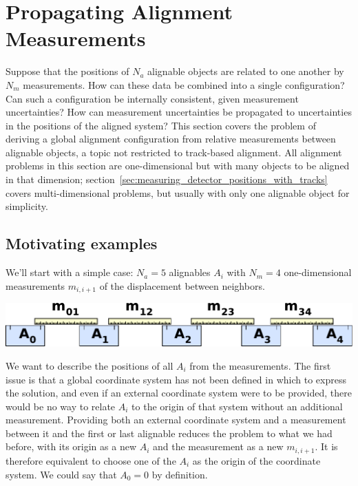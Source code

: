 \documentclass[12pt]{article}
\begin{document}
\section{Propagating Alignment Measurements}
\label{sec:propagating_alignment_measurements}

Suppose that the positions of $N_a$ alignable objects are related to
one another by $N_m$ measurements.  How can these data be combined
into a single configuration?  Can such a configuration be internally
consistent, given measurement uncertainties?  How can measurement
uncertainties be propagated to uncertainties in the positions of the
aligned system?  This section covers the problem of deriving a global
alignment configuration from relative measurements between alignable
objects, a topic not restricted to track-based alignment.  All
alignment problems in this section are one-dimensional but with many
objects to be aligned in that dimension;
section~\ref{sec:measuring_detector_positions_with_tracks} covers
multi-dimensional problems, but usually with only one alignable object
for simplicity.

\subsection{Motivating examples}

\vspace{0.2 cm}
\begin{minipage}{\linewidth}
We'll start with a simple case: $N_a=5$ alignables $A_i$ with $N_m=4$
one-dimensional measurements $m_{i,i+1}$ of the displacement between
neighbors.
\begin{center}
\includegraphics[width=0.8\linewidth]{PLOTS/propagating_example1.pdf}
\end{center}
\end{minipage}

\vspace{0.4 cm}
We want to describe the positions of all $A_i$ from the measurements.
The first issue is that a global coordinate system has not been
defined in which to express the solution, and even if an external
coordinate system were to be provided, there would be no way to relate
$A_i$ to the origin of that system without an additional measurement.
Providing both an external coordinate system and a measurement between
it and the first or last alignable reduces the problem to what we had
before, with its origin as a new $A_i$ and the measurement as a new
$m_{i,i+1}$.  It is therefore equivalent to choose one of the $A_i$ as
the origin of the coordinate system.  We could say that $A_0=0$ by
definition.
\end{document}
